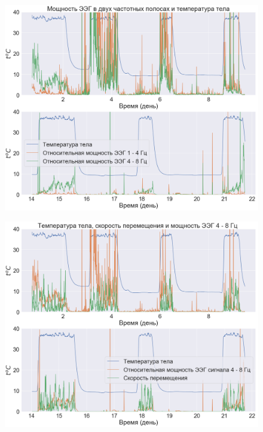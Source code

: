 \documentclass[12pt,a4paper,oneside]{article}
\begin{document}
\begin{figure}[H]
\centering
\begin{minipage}{.5\textwidth}
  \centering
  \includegraphics[width=\textwidth]{general3.png}
  \label{fig:general3}
\end{minipage}%
\begin{minipage}{.5\textwidth}
  \centering
  \includegraphics[width=\textwidth]{general4.png}
  \label{fig:general4}
\end{minipage}
\end{figure}
\end{document}
